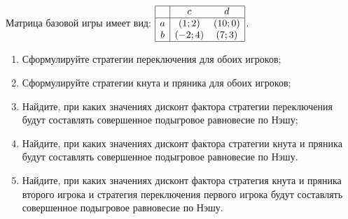\begin{problem}

Матрица базовой игры имеет вид:  $\begin{array}{|c|cc|}  \hline {} & {c} & {d} \\  \hline {a} & {\left(1;2\right)} & {\left(10;0\right)} \\ {b} & {\left(-2;4\right)} & {\left(7;3\right)} \\  \hline  \end{array}$.
\begin{enumerate}
\item Сформулируйте стратегии переключения для обоих игроков;\par
\item Сформулируйте стратегии кнута и пряника для обоих игроков;\par
\item  Найдите, при каких значениях дисконт фактора стратегии переключения будут составлять совершенное подыгровое равновесие по Нэшу;\par
\item Найдите, при каких значениях дисконт фактора стратегии кнута и пряника будут составлять совершенное подыгровое равновесие по Нэшу.\par
\item Найдите, при каких значениях дисконт фактора стратегия кнута и пряника второго игрока и стратегия переключения первого игрока будут составлять совершенное подыгровое равновесие по Нэшу.
\end{enumerate}


\begin{sol}

\end{sol}
\end{problem}



